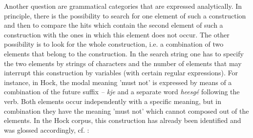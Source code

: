 Another question are grammatical categories that are expressed analytically. In principle, there is the possibility to search for one element of such a construction and then to compare the hits which contain the second element of such a construction with the ones in which this element does not occur. The other possibility is to look for the whole construction, i.e. a combination of two elements that belong to the construction. In the search string one has to specify the two elements by strings of characters and the number of elements that may interrupt this construction by variables (with certain regular expressions). For instance, in Hoc{\A}k, the modal meaning 'must not' is expressed by means of a combination of the future suffix \textit{-- kje} and a separate word \textit{heesg\'e} following the verb. Both elements occur independently with a specific meaning, but in combination they have the meaning 'must not' which cannot composed out of the elements. In the Hoc{\A}k corpus, this construction has already been identified and was glossed accordingly, cf. : 
 
